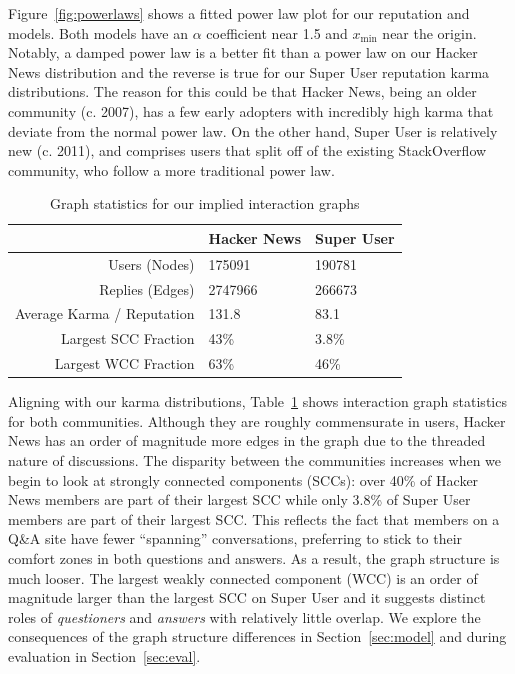 \documentclass[11pt]{article}
\begin{document}
Figure~\ref{fig:powerlaws} shows a fitted power law plot for our reputation and
models. Both models have an $\alpha$ coefficient near 1.5 and $x_{\text{min}}$
near the origin. Notably, a damped power law is a better fit than a power law on
our Hacker News distribution and the reverse is true for our Super User
reputation karma distributions. The reason for this could be that Hacker News,
being an older community (c. 2007), has a few early adopters with incredibly
high karma that deviate from the normal power law. On the other hand, Super User
is relatively new (c. 2011), and comprises users that split off of the existing
StackOverflow community, who follow a more traditional power law.

\begin{table}[t]
\begin{center}
\begin{tabular}{| r | l l |}
\hline
& \textbf{Hacker News} & \textbf{Super User} \\
\hline
Users (Nodes) & 175091 & 190781 \\
Replies (Edges) & 2747966 & 266673 \\
Average Karma / Reputation & 131.8 & 83.1 \\
Largest SCC Fraction & 43\% & 3.8\% \\
Largest WCC Fraction & 63\% & 46\% \\
\hline
\end{tabular}
\end{center}
\caption{Graph statistics for our implied interaction graphs}
\label{tab:graphstats}
\end{table}

Aligning with our karma distributions, Table~\ref{tab:graphstats} shows
interaction graph statistics for both communities. Although they are roughly
commensurate in users, Hacker News has an order of magnitude more edges in the
graph due to the threaded nature of discussions. The disparity between the
communities increases when we begin to look at strongly connected components
(SCCs): over 40\% of Hacker News members are part of their largest SCC while
only 3.8\% of Super User members are part of their largest SCC\@. This reflects
the fact that members on a Q\&A site have fewer ``spanning'' conversations,
preferring to stick to their comfort zones in both questions and answers. As a
result, the graph structure is much looser. The largest weakly connected
component (WCC) is an order of magnitude larger than the largest SCC on Super
User and it suggests distinct roles of \textit{questioners} and \textit{answers}
with relatively little overlap. We explore the consequences of the graph structure
differences in Section~\ref{sec:model} and during evaluation in Section~\ref{sec:eval}.
\end{document}
